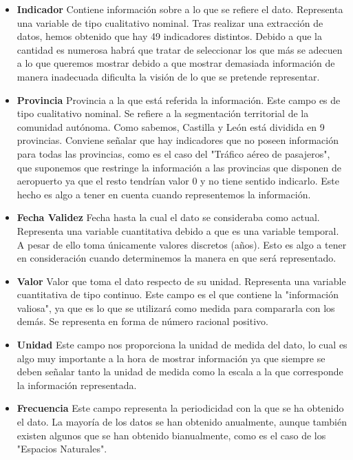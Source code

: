 \documentclass{article}
\begin{document}
			\begin{itemize}

				\item {\bf Indicador } Contiene información sobre a lo que se refiere el dato. Representa una variable de tipo cualitativo nominal. Tras realizar una extracción de datos, hemos obtenido que hay 49 indicadores distintos. Debido a que la cantidad es numerosa habrá que tratar de seleccionar los que más se adecuen a lo que queremos mostrar debido a que mostrar demasiada información de manera inadecuada dificulta la visión de lo que se pretende representar.

				\item {\bf Provincia } Provincia a la que está referida la información. Este campo es de tipo cualitativo nominal. Se refiere a la segmentación territorial de la comunidad autónoma. Como sabemos, Castilla y León está dividida en 9 provincias. Conviene señalar que hay indicadores que no poseen información para todas las provincias, como es el caso del "Tráfico aéreo de pasajeros", que suponemos que restringe la información a las provincias que disponen de aeropuerto ya que el resto tendrían valor 0 y no tiene sentido indicarlo. Este hecho es algo a tener en cuenta cuando representemos la información.

				\item {\bf Fecha Validez } Fecha hasta la cual el dato se consideraba como actual. Representa una variable cuantitativa debido a que es una variable temporal. A pesar de ello toma únicamente valores discretos (años). Esto es algo a tener en consideración cuando determinemos la manera en que será representado.

				\item {\bf Valor } Valor que toma el dato respecto de su unidad.  Representa una variable cuantitativa de tipo continuo. Este campo es el que contiene la "información valiosa", ya que es lo que se utilizará como medida para compararla con los demás. Se representa en forma de número racional positivo.

				\item {\bf Unidad } Este campo nos proporciona la unidad de medida del dato, lo cual es algo muy importante a la hora de mostrar información ya que siempre se deben señalar tanto la unidad de medida como la escala a la que corresponde la información representada.

				\item {\bf Frecuencia } Este campo representa la periodicidad con la que se ha obtenido el dato. La mayoría de los datos se han obtenido anualmente, aunque también existen algunos que se han obtenido bianualmente, como es el caso de los "Espacios Naturales".

			\end{itemize}
\end{document}
